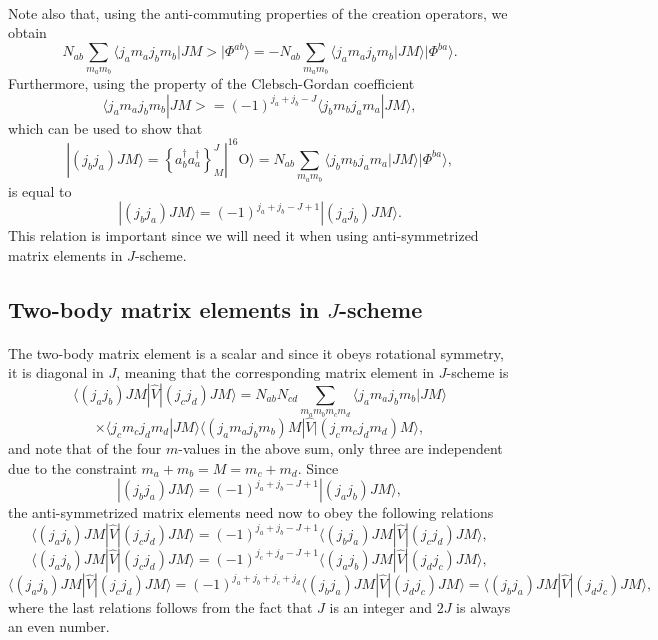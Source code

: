 \documentclass[%
twoside,                 %
final,                   %
10pt]{article}
\begin{document}
\paragraph{}
Note also that, using the anti-commuting properties of the creation operators, we obtain
\[
N_{ab}\sum_{m_am_b}\langle j_am_aj_bm_b|JM>|\Phi^{ab}\rangle=-N_{ab}\sum_{m_am_b}\langle j_am_aj_bm_b|JM\rangle|\Phi^{ba}\rangle.
\]
Furthermore, using the property of the Clebsch-Gordan coefficient
\[
\langle j_am_aj_bm_b|JM>=(-1)^{j_a+j_b-J}\langle j_bm_bj_am_a|JM\rangle,
\]
which can be used to show that
\[
|(j_bj_a)JM\rangle  = \left\{a^{\dagger}_ba^{\dagger}_a\right\}^J_M|^{16}\mathrm{O}\rangle=N_{ab}\sum_{m_am_b}\langle j_bm_bj_am_a|JM\rangle|\Phi^{ba}\rangle, 
\]
is equal to 
\[
|(j_bj_a)JM\rangle=(-1)^{j_a+j_b-J+1}|(j_aj_b)JM\rangle.
\]
This relation is important since we will need it when using anti-symmetrized matrix elements in $J$-scheme.



\subsection*{Two-body matrix elements in $J$-scheme}

\paragraph{}
The two-body matrix element is a scalar and since it obeys rotational symmetry, it is diagonal in $J$, 
meaning that the corresponding matrix element in $J$-scheme is 
\[
\langle (j_aj_b) JM | \hat{V} | (j_cj_d) JM \rangle = N_{ab}N_{cd}\sum_{m_am_b m_cm_d}\langle j_am_aj_bm_b|JM\rangle
\]
\[\times \langle j_cm_cj_dm_d|JM\rangle\langle (j_am_aj_bm_b)M |  \hat{V} | (j_cm_cj_dm_d)M \rangle,
\]
and note that of the four $m$-values in the above sum, only three are independent due to the constraint $m_a+m_b=M=m_c+m_d$.
Since
\[
|(j_bj_a)JM\rangle=(-1)^{j_a+j_b-J+1}|(j_aj_b)JM\rangle,
\]
the anti-symmetrized matrix elements need now to obey the following relations
\[
\langle (j_aj_b) JM | \hat{V} | (j_cj_d) JM \rangle = (-1)^{j_a+j_b-J+1}\langle (j_bj_a) JM | \hat{V} | (j_cj_d) JM \rangle,
\]
\[
\langle (j_aj_b) JM | \hat{V} | (j_cj_d) JM \rangle = (-1)^{j_c+j_d-J+1}\langle (j_aj_b) JM | \hat{V} | (j_dj_c) JM \rangle,
\]
\[
\langle (j_aj_b) JM | \hat{V} | (j_cj_d) JM \rangle = (-1)^{j_a+j_b+j_c+j_d}\langle (j_bj_a) JM | \hat{V} | (j_dj_c) JM \rangle=\langle (j_bj_a) JM | \hat{V} | (j_dj_c) JM \rangle,
\]
where the last relations follows from the fact that $J$ is an integer and $2J$ is always an even number.
\end{document}
